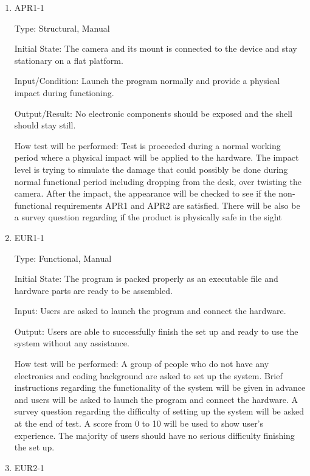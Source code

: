 \documentclass[12pt, titlepage]{article}
\begin{document}
\begin{enumerate}

\item{APR1-1\\}

Type: Structural, Manual
					
Initial State: The camera and its mount is connected to the device and stay stationary on a flat platform.
					
Input/Condition: Launch the program normally and provide a physical impact during functioning.
					
Output/Result: No electronic components should be exposed and the shell should stay still.
					
How test will be performed: Test is proceeded during a normal working period where a physical impact will be applied to the hardware. The impact level is trying to simulate the damage that could possibly be done during normal functional period including dropping from the desk, over twisting the camera. After the impact, the appearance will be checked to see if the non-functional
requirements APR1 and APR2 are satisfied. There will be also be a survey question regarding if the product is physically safe in the sight
					
\item{EUR1-1\\}

Type: Functional, Manual
					
Initial State: The program is packed properly as an executable file and hardware parts are ready to be assembled.
					
Input: Users are asked to launch the program and connect the hardware. 
					
Output: Users are able to successfully finish the set up and ready to use the system without any assistance.
					
How test will be performed: A group of people who do not have any electronics and coding background are asked to set up the system. Brief instructions regarding the functionality of the system will be given in advance and users will be asked to launch the program and connect the hardware. A survey question regarding the difficulty of setting up the system will be asked at the end of test. A score from 0 to 10 will be used to show user's experience. The majority of users should have no serious difficulty finishing the set up.

\item{EUR2-1\\}


\end{enumerate}
\end{document}
